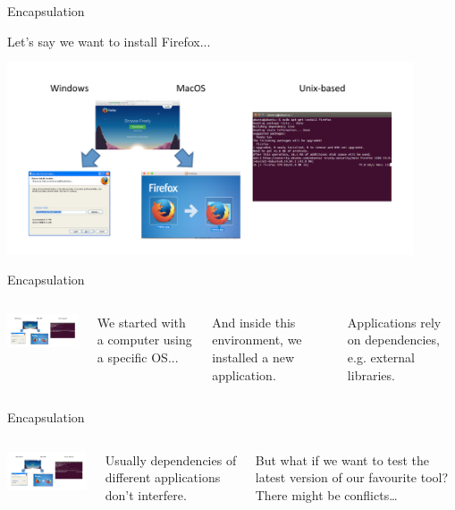 \begin{frame}{Encapsulation}

Let's say we want to install Firefox...

\includegraphics[width=12cm]{02_encapsulation/figures/install_firefox.pdf}


\end{frame}

\begin{frame}{Encapsulation}
\begin{columns}

\includegraphics[width=6cm]{02_encapsulation/figures/install_firefox.pdf}

We started with a computer using a specific OS...


And inside this environment, we installed a new application.


Applications rely on dependencies, e.g. external libraries.

\end{columns}
\end{frame}

\begin{frame}{Encapsulation}
\begin{columns}

\includegraphics[width=6cm]{02_encapsulation/figures/install_firefox.pdf}

Usually dependencies of different applications don’t interfere.


But what if we want to test the latest version of our favourite tool?
There might be conflicts…

\end{columns}
\end{frame}

